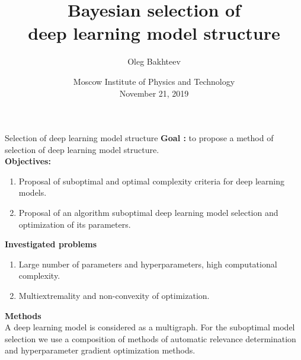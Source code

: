 \documentclass[usenames,dvipsnames,11pt,pdf,utf8,russian,aspectratio=43]{beamer}
\title[Model structure selection]{Bayesian selection of \\deep learning model structure}
\author{Oleg Bakhteev}
\institute[]{Supervisor: Prof. Vadim Strijov\\}
\date[2019]{Moscow Institute of Physics and Technology\\November 21, 2019}
\begin{document}

\begin{frame}
  \titlepage
\end{frame}



\begin{frame}{Selection of deep learning model structure}
\small
\textbf{Goal :} to propose a method of selection of deep learning model structure.\\
\textbf{Objectives:}
\begin{enumerate}
\item Proposal of suboptimal and optimal complexity criteria for deep learning models.
\item Proposal of an algorithm suboptimal deep learning model selection and optimization of its parameters.
\end{enumerate}
\textbf{Investigated problems}
\begin{enumerate}
\item Large number of parameters and hyperparameters, high computational complexity.
\item Multiextremality and non-convexity of optimization.
\end{enumerate}
\textbf{Methods}\\
A deep learning model is considered as a multigraph. For the suboptimal model selection we use a composition of methods of automatic relevance determination and hyperparameter gradient optimization methods.
\end{frame}
\end{document}

